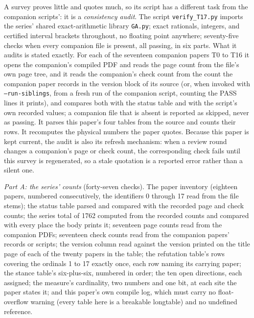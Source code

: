 \documentclass[11pt]{article}
\theoremstyle{definition}
\theoremstyle{plain}
\begin{document}
\label{c:note.programme.setting-machine-verification}
A survey proves little and quotes much, so its script has a different task from the companion scripts': it is a \emph{consistency audit}. The script \texttt{verify\_T17.py} \cite{ButlerVerifyT17} imports the series' shared exact-arithmetic library \texttt{GA.py}; exact rationals, integers, and certified interval brackets throughout, no floating point anywhere; seventy-five checks when every companion file is present, all passing, in six parts. What it audits is stated exactly. For each of the seventeen companion papers T0 to T16 it opens the companion's compiled PDF and reads the page count from the file's own page tree, and it reads the companion's check count from the count the companion paper records in the version block of its source (or, when invoked with \texttt{--run-siblings}, from a fresh run of the companion script, counting the PASS lines it prints), and compares both with the status table and with the script's own recorded values; a companion file that is absent is reported as skipped, never as passing. It parses this paper's four tables from the source and counts their rows. It recomputes the physical numbers the paper quotes. Because this paper is kept current, the audit is also its refresh mechanism: when a review round changes a companion's page or check count, the corresponding check fails until this survey is regenerated, so a stale quotation is a reported error rather than a silent one.

\emph{Part A: the series' counts} (forty-seven checks). The paper inventory (eighteen papers, numbered consecutively, the identifiers 0 through 17 read from the file stems); the status table parsed and compared with the recorded page and check counts; the series total of 1762 computed from the recorded counts and compared with every place the body prints it; seventeen page counts read from the companion PDFs; seventeen check counts read from the companion papers' records or scripts; the version column read against the version printed on the title page of each of the twenty papers in the table; the refutation table's rows covering the ordinals 1 to 17 exactly once, each row naming its carrying paper; the stance table's six-plus-six, numbered in order; the ten open directions, each assigned; the measure's cardinality, two numbers and one bit, at each site the paper states it; and this paper's own compile log, which must carry no float-overflow warning (every table here is a breakable longtable) and no undefined reference.
\end{document}
